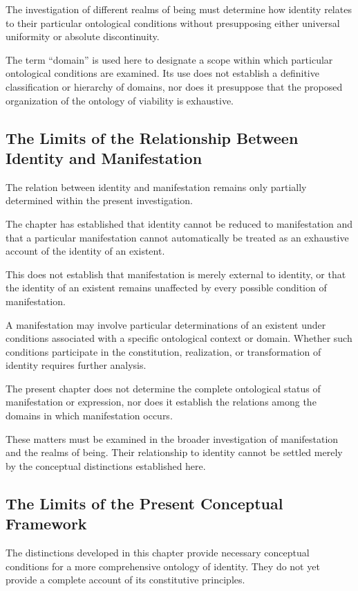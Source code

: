 The investigation of different realms of being must
determine how identity relates to their particular
ontological conditions without presupposing either
universal uniformity or absolute discontinuity.

The term ``domain'' is used here to designate a scope
within which particular ontological conditions are
examined. Its use does not establish a definitive
classification or hierarchy of domains, nor does it
presuppose that the proposed organization of the ontology
of viability is exhaustive.

\subsection{The Limits of the Relationship Between Identity and Manifestation}

The relation between identity and manifestation remains
only partially determined within the present investigation.

The chapter has established that identity cannot be
reduced to manifestation and that a particular
manifestation cannot automatically be treated as an
exhaustive account of the identity of an existent.

This does not establish that manifestation is merely
external to identity, or that the identity of an existent
remains unaffected by every possible condition of
manifestation.

A manifestation may involve particular determinations
of an existent under conditions associated with a
specific ontological context or domain. Whether such
conditions participate in the constitution, realization,
or transformation of identity requires further analysis.

The present chapter does not determine the complete
ontological status of manifestation or expression, nor
does it establish the relations among the domains in
which manifestation occurs.

These matters must be examined in the broader
investigation of manifestation and the realms of being.
Their relationship to identity cannot be settled merely
by the conceptual distinctions established here.

\subsection{The Limits of the Present Conceptual Framework}

The distinctions developed in this chapter provide
necessary conceptual conditions for a more comprehensive
ontology of identity. They do not yet provide a complete
account of its constitutive principles.

